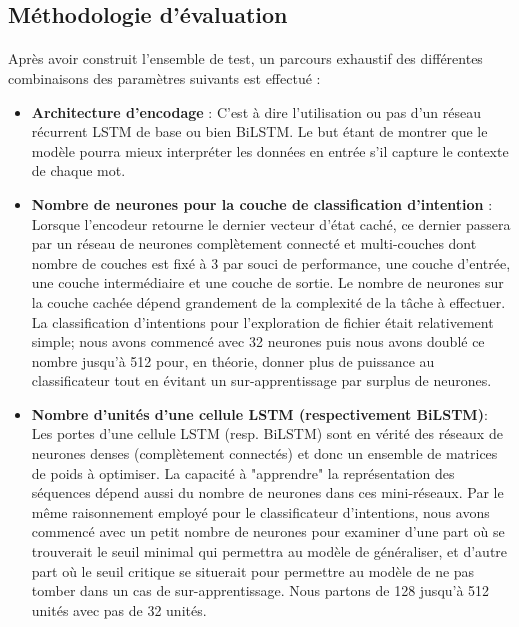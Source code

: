 	\subsection{Méthodologie d'évaluation}
	\label{nlu_steps}
	\paragraph{}
	Après avoir construit l'ensemble de test, un parcours exhaustif des différentes combinaisons des paramètres suivants est effectué : 
	\begin{itemize}
		\item \textbf{Architecture d'encodage} :
		C'est à dire l'utilisation ou pas d'un réseau récurrent LSTM de base ou bien BiLSTM. Le but étant de montrer que le modèle pourra mieux interpréter les données en entrée s'il capture le contexte de chaque mot.
		
		\item \textbf{Nombre de neurones pour la couche de classification d'intention } : Lorsque l'encodeur retourne le dernier vecteur d'état caché, ce dernier passera par un réseau de neurones complètement connecté et multi-couches dont nombre de couches est fixé à 3 par souci de performance, une couche d'entrée, une couche intermédiaire et une couche de sortie. Le nombre de neurones sur la couche cachée dépend grandement de la complexité de la tâche à effectuer. La classification d'intentions pour l'exploration de fichier était relativement simple; nous avons commencé avec 32 neurones puis nous avons doublé ce nombre jusqu'à 512 pour, en théorie, donner plus de puissance au classificateur tout en évitant un sur-apprentissage par surplus de neurones.
		
		\item \textbf{Nombre d'unités d'une cellule LSTM (respectivement BiLSTM)}:
		Les portes d'une cellule LSTM (resp. BiLSTM) sont en vérité des réseaux de neurones denses (complètement connectés) et donc un ensemble de matrices de poids à optimiser. La capacité à "apprendre" la représentation des séquences dépend aussi du nombre de neurones dans ces mini-réseaux. Par le même raisonnement employé pour le classificateur d'intentions, nous avons commencé avec un petit nombre de neurones pour examiner d'une part où se trouverait le seuil minimal qui permettra au modèle de généraliser, et d'autre part où le seuil critique se situerait pour permettre au modèle de ne pas tomber dans un cas de sur-apprentissage. Nous partons de 128 jusqu'à 512 unités avec pas de 32 unités.
		

\end{itemize}
